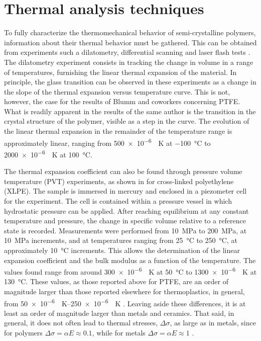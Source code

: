 \section{Thermal analysis techniques}

To fully characterize the thermomechanical behavior of semi-crystalline polymers, information about their thermal behavior must be gathered.
This can be obtained from experiments such a dilatometry, differential scanning and laser flash tests \citep{blummCharacterizationPTFEUsing2010}.
The dilatometry experiment consists in tracking the change in volume in a range of temperatures, furnishing the linear thermal expansion of the material.
In principle, the glass transition can be observed in these experiments as a change in the slope of the thermal expansion versus temperature curve.
This is not, however, the case for the results of Blumm and coworkers \citep{blummCharacterizationPTFEUsing2010} concerning PTFE.
What is readily apparent in the results of the same author is the transition in the crystal structure of the polymer, visible as a step in the curve.
The evolution of the linear thermal expansion in the remainder of the temperature range is approximately linear, ranging from \SI{500e-6}{\per\kelvin} at \SI{-100}{\celsius} to \SI{2000e-6}{\per\kelvin} at \SI{100}{\celsius}.

The thermal expansion coefficient can also be found through pressure volume temperature (PVT) experiments, as shown in \cite{olaszViscoelasticModelCrossLinked2005} for cross-linked polyethylene (XLPE).
The sample is immersed in mercury and enclosed in a piezometer cell for the experiment.
The cell is contained within a pressure vessel in which hydrostatic pressure can be applied.
After reaching equilibrium at any constant temperature and pressure, the change in specific volume relative to a reference state is recorded.
Measurements were performed from \SI{10}{\mega\pascal} to \SI{200}{\mega\pascal}, at \SI{10}{\mega\pascal} increments, and at temperatures ranging from \SI{25}{\celsius} to \SI{250}{\celsius}, at approximately \SI{10}{\celsius} increments.
This allows the determination of the linear expansion coefficient and the bulk modulus as a function of the temperature.
The values found range from  around \SI{300e-6}{\per\kelvin} at \SI{50}{\celsius} to \SI{1300e-6}{\per\kelvin} at \SI{130}{\celsius}.
These values, as those reported above for PTFE, are an order of magnitude larger than those reported elsewhere for thermoplastics, in general, from \SIrange{50e-6}{250e-6}{\per\kelvin} \citep{ashbyMaterialsSelectionMechanical1999}.
Leaving aside these differences, it is at least an order of magnitude larger than metals and ceramics.
That said, in general, it does not often lead to thermal stresses, $\Delta \sigma$, as large as in metals, since for polymers $\Delta \sigma = \alpha E \approx 0.1$, while for metals $\Delta \sigma = \alpha E \approx 1$ \citep{ashbyMaterialsSelectionMechanical1999}.


